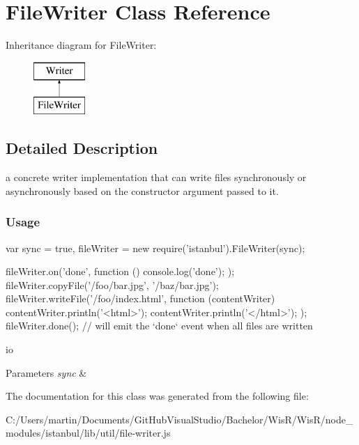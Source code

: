 \hypertarget{class_file_writer}{}\section{File\+Writer Class Reference}
\label{class_file_writer}
Inheritance diagram for File\+Writer\+:\begin{figure}[H]
\begin{center}
\leavevmode
\includegraphics[height=2.000000cm]{class_file_writer}
\end{center}
\end{figure}


\subsection{Detailed Description}
a concrete writer implementation that can write files synchronously or asynchronously based on the constructor argument passed to it.

\subsubsection*{Usage }

\begin{DoxyVerb} var sync = true,
     fileWriter = new require('istanbul').FileWriter(sync);

 fileWriter.on('done', function () { console.log('done'); });
 fileWriter.copyFile('/foo/bar.jpg', '/baz/bar.jpg');
 fileWriter.writeFile('/foo/index.html', function (contentWriter) {
     contentWriter.println('<html>');
     contentWriter.println('</html>');
 });
 fileWriter.done(); // will emit the `done` event when all files are written
\end{DoxyVerb}


io 
\begin{DoxyParams}{Parameters}
{\em sync} & \\
\hline
\end{DoxyParams}


The documentation for this class was generated from the following file\+:\begin{DoxyCompactItemize}
\item 
C\+:/\+Users/martin/\+Documents/\+Git\+Hub\+Visual\+Studio/\+Bachelor/\+Wis\+R/\+Wis\+R/node\+\_\+modules/istanbul/lib/util/file-\/writer.\+js\end{DoxyCompactItemize}
